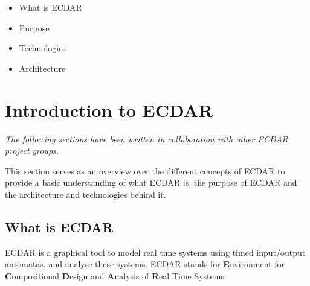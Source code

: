 
\begin{itemize}
\item What is ECDAR
\item Purpose
\item Technologies
\item Architecture 
\end{itemize}

\section{Introduction to ECDAR}
\textit{The following sections have been written in collaboration with other ECDAR
project groups.}

This section serves as an overview over the different concepts of ECDAR to provide a basic understanding of what ECDAR is, the purpose of ECDAR and the architecture and technologies behind it. 


\subsection{What is ECDAR}
ECDAR is a graphical tool to model real time systems using timed input/output automatas, and analyse these systems. 
ECDAR stands for \textbf{E}nvironment for \textbf{C}ompositional \textbf{D}esign and \textbf{A}nalysis of \textbf{R}eal Time Systems.
